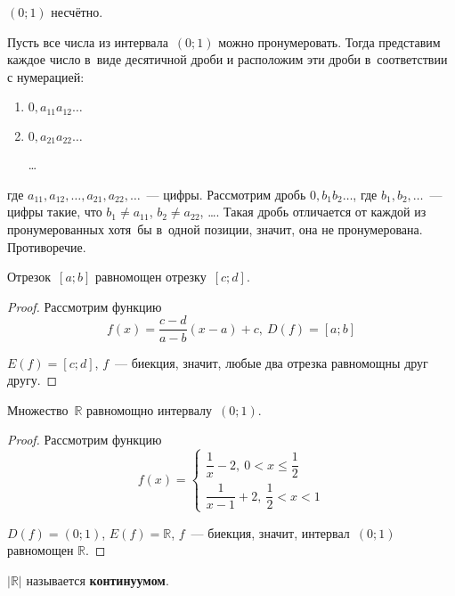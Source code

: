 \begin{statement}
$(0; 1)$ несчётно.
\end{statement}
\begin{proofcontra}
Пусть все числа из интервала~$(0; 1)$ можно пронумеровать.
Тогда представим каждое число в~виде десятичной дроби и расположим эти дроби в~соответствии с нумерацией:
\begin{enumerate}
	\item $0{,}a_{11}a_{12} \ldots$
	\item $0{,}a_{21}a_{22} \ldots$
	
	\ldots
\end{enumerate}
где $a_{11}, a_{12}, \ldots, a_{21}, a_{22}, \ldots$~--- цифры.
Рассмотрим дробь $0{,}b_1 b_2 \ldots$, где $b_1, b_2, \ldots$~--- цифры такие, что $b_1 \neq a_{11}$, \linebreak $b_2 \neq a_{22}$, \ldots.
Такая дробь отличается от каждой из пронумерованных хотя~бы в~одной позиции, значит, она не пронумерована.
Противоречие.
\end{proofcontra}

\begin{statement}
Отрезок~$[a; b]$ равномощен отрезку~$[c; d]$.
\end{statement}
\begin{proof}
Рассмотрим функцию
\begin{equation*}
f(x) = \frac{c - d}{a - b} (x - a) + c, \ D(f) = [a; b]
\end{equation*}

$E(f) = [c; d]$, $f$~--- биекция, значит, любые два отрезка равномощны друг другу.
\end{proof}

\begin{statement}
Множество~$\mathbb R$ равномощно интервалу~$(0; 1)$.
\end{statement}
\begin{proof}
Рассмотрим функцию
\begin{equation*}
f(x) =
\begin{cases}
\dfrac1x - 2, \ 0 < x \leqslant \dfrac12 \\
\dfrac1{x - 1} + 2, \ \dfrac12 < x < 1
\end{cases}
\end{equation*}

$D(f) = (0; 1)$, $E(f) = \mathbb R$, $f$~--- биекция, значит, интервал~$(0; 1)$ равномощен $\mathbb R$.
\end{proof}

$|\mathbb R|$ называется \textbf{континуумом}.